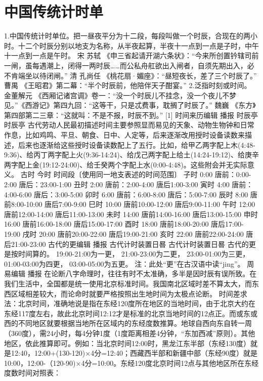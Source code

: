 \section{中国传统计时单}
1.中国传统计时单位。把一昼夜平分为十二段，每段叫做一个时辰，合现在的两小时。十二个时辰分别以地支为名称，从半夜起算，半夜十一点到一点是子时，中午十一点到一点是午时。 宋 苏轼 《申三省起请开湖六条状》：“今来所创置钤辖司前一闸，虽每遇潮上，闭得一两时辰……而公私舟舡欲出入闸者，自须先期出入，必不肯端坐以待闭闸。” 清 孔尚任 《桃花扇·媚座》：“昼短夜长，差了三个时辰了。” 曹禺 《王昭君》第二幕：“半个时辰前，他陪伴天子酣宴。”
2.泛指时刻或时间。 金董解元 《西厢记诸宫调》卷一：“没一个时辰儿不挂念，没一个夜儿不梦见。”《西游记》第四九回：“这等干，只是忒费事，耽搁了时辰了。” 魏巍 《东方》第四部第二三章：“这就叫：不是不报，时辰不到。” [1] 
时间来历编辑 播报
时辰亭
时辰亭
古代劳动人民最初描述时间主要参照显而易见的天象、动物生物钟和日常作息，比如鸡鸣、平旦、朝食、日中、人定等，后来逐渐改用授时设备读数来描述，后来也逐渐给这些授时设备读数配上了五行。比如，给甲乙两字配上木(4:48-9:36)、给丙丁两字配上火(9:36-14:24)、给戊己两字配上给土(14:24-19:12)、给庚辛两字配上金(19:12-24:00)、给壬癸两个字配上水(0:00-4:48)。这些附会并无实际意义。
古时
今时
时间段〔使用同一地支表述的时间范围〕
子时
0:00
唐前：0:00-2:00
唐后：23:00-1:00
丑时
2:00
唐前：2:00-4:00
唐后1:00-3:00
寅时
4:00
唐前：4:00-6:00
唐后：3:00-5:00
卯时
6:00
唐前：6:00-8:00
唐后：5:00-7:00
辰时
8:00
唐前8:00-10:00
唐后7:00-9:00
巳时
10:00
唐前10:00-12:00
唐后9:00-11:00
午时
12:00
唐前12:00-14:00
唐后11:00-13:00
未时
14:00
唐前14:00-16:00
唐后13:00-15:00
申时
16:00
唐前16:00-18:00
唐后15:00-17:00
酉时
18:00
唐前18:00-20:00
唐后17:00-19:00
戌时
20:00
唐前20:00-22:00
唐后19:00-21:00
亥时
22:00
唐前22:00-24:00
唐后21:00-23:00
古代的更编辑 播报
古代计时装置日晷
古代计时装置日晷
古代的更是按时间算的。
19:00-21:00为一更，
21:00-23:00为二更，
23:00-01:00为三更，
01:00-03:00为四更，
03:00-05:00为五更。
注：此处“更”在古汉语中读“jing”。
周易编辑 播报
在论断八字命理时，往往有时不太准确，多半是因时辰有误所致。在我们生活中，全国都是统一使用北京标准时间。我国南北区域时差不算太大，而东西区域相差较大，而论命时就要严格按照出生地时间为太极点论断。
时间差求法：北京时间，准确地说是指在东经120度所在地区的当地时间，由于北京大约在东经117度左右，故此北京时间12:12才是标准的北京当地时间的12点正。而或东或西的不同地区就要根据当地所在区域内的东经度数推算。地球自西向东自转一周（360度），需24小时，每4分钟1度（1度距离相差4分钟，“东加西减”原则）。其他地区，依此推算即可。例如：当北京时间12:00时，黑龙江东半部（东经130度）就是12:40，{12:00+(130-120)×4分=12:40}；西藏西半部和新疆中部（东经90度）就是10:00，{12:00-（120-90)×4分=10:00}。东经120度北京时间12点与其他地区所在东经度数时间对照表：
